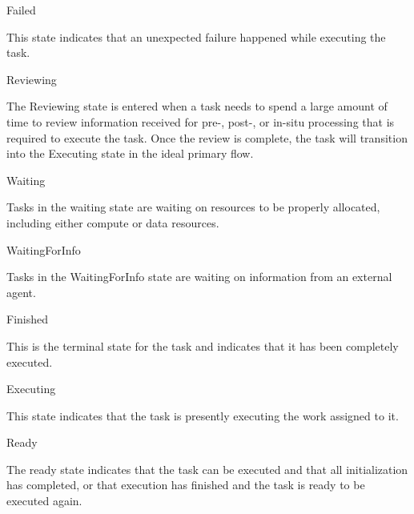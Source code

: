 Failed

This state indicates that an unexpected failure happened while executing the task.

Reviewing

The Reviewing state is entered when a task needs to spend a large amount of time to review information received for pre-, post-, or in-situ processing that is required to execute the task. Once the review is complete, the task will transition into the Executing state in the ideal primary flow.

Waiting

Tasks in the waiting state are waiting on resources to be properly allocated, including either compute or data resources.

WaitingForInfo

Tasks in the WaitingForInfo state are waiting on information from an external agent.

Finished

This is the terminal state for the task and indicates that it has been completely executed.

Executing

This state indicates that the task is presently executing the work assigned to it.

Ready

The ready state indicates that the task can be executed and that all initialization has completed, or that execution has finished and the task is ready to be executed again.
